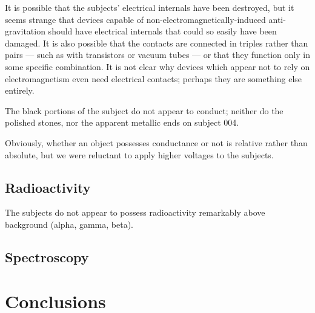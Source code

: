 \documentclass[10pt]{article}
\begin{document}
It is possible that the subjects' electrical internals have been destroyed, but it seems strange that devices capable of non-electromagnetically-induced anti-gravitation should have electrical internals that could so easily have been damaged.
It is also possible that the contacts are connected in triples rather than pairs --- such as with transistors or vacuum tubes --- or that they function only in some specific combination.
It is not clear why devices which appear not to rely on electromagnetism even need electrical contacts; perhaps they are something else entirely.

The black portions of the subject do not appear to conduct; neither do the polished stones, nor the apparent metallic ends on subject 004.

Obviously, whether an object possesses conductance or not is relative rather than absolute, but we were reluctant to apply higher voltages to the subjects.

\subsection{Radioactivity}
The subjects do not appear to possess radioactivity remarkably above background (alpha, gamma, beta).

\subsection{Spectroscopy}


\section{Conclusions}\label{conclusions}


%
%
\end{document}
